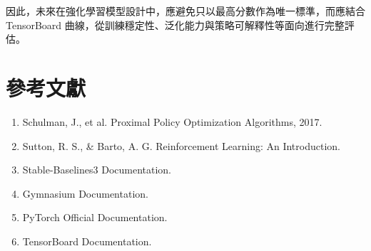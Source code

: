 \documentclass[12pt,a4paper]{ctexart}
\begin{document}
因此，未來在強化學習模型設計中，應避免只以最高分數作為唯一標準，而應結合 TensorBoard 曲線，從訓練穩定性、泛化能力與策略可解釋性等面向進行完整評估。

\section{參考文獻}

\begin{enumerate}
  \item Schulman, J., et al. Proximal Policy Optimization Algorithms, 2017.
  \item Sutton, R. S., \& Barto, A. G. Reinforcement Learning: An Introduction.
  \item Stable-Baselines3 Documentation.
  \item Gymnasium Documentation.
  \item PyTorch Official Documentation.
  \item TensorBoard Documentation.
\end{enumerate}
\end{document}
